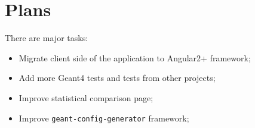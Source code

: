 \section{Plans}
\label{sec-plans}

There are major tasks:

\begin{itemize}
	\item Migrate client side of the application to Angular2+ framework;
	\item Add more Geant4 tests and tests from other projects;
	\item Improve statistical comparison page;
	\item Improve {\tt geant-config-generator} framework;
\end{itemize}
